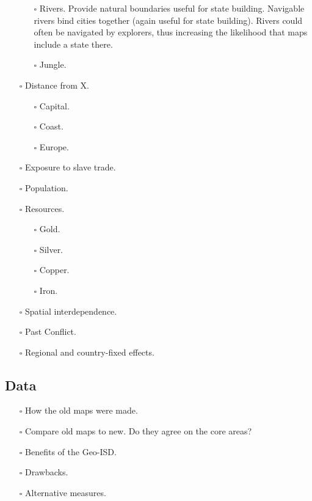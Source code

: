 \documentclass[12pt]{article}
\begin{document}
\begin{itemize}
\begin{itemize}
		\item[$\square$] Rivers.
			Provide natural boundaries useful for state building.
			Navigable rivers bind cities together (again useful for
			state building). Rivers could often be navigated by
			explorers, thus increasing the likelihood that maps
			include a state there.
		\item[$\square$] Jungle.
	\end{itemize}
	\item[$\square$] Distance from X.
	\begin{itemize}
		\item[$\square$] Capital.
		\item[$\square$] Coast.
		\item[$\square$] Europe.
	\end{itemize}
	\item[$\square$] Exposure to slave trade.
	\item[$\square$] Population.
	\item[$\square$] Resources.
	\begin{itemize}
		\item[$\square$] Gold.
		\item[$\square$] Silver.
		\item[$\square$] Copper.
		\item[$\square$] Iron.
	\end{itemize}
	\item[$\square$] Spatial interdependence.
	\item[$\square$] Past Conflict.
	\item[$\square$] Regional and country-fixed effects.
\end{itemize}

\subsection{Data}
\begin{itemize}
	\item[$\square$] How the old maps were made.
	\item[$\square$] Compare old maps to new. Do they agree on the core
		areas?
	\item[$\square$] Benefits of the Geo-ISD.
	\item[$\square$] Drawbacks.
	\item[$\square$] Alternative measures.
\end{itemize}
\end{document}

